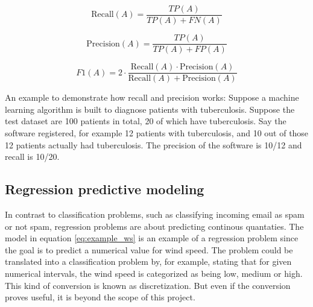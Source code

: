 \begin{equation} \label{eq:recall}
	\mbox{Recall}(A) = \frac{TP(A)}{TP(A) + FN(A)}
\end{equation}

\begin{equation} \label{eq:precision}
	\mbox{Precision}(A) = \frac{TP(A)}{TP(A) + FP(A)}
\end{equation}

\begin{equation} \label{eq:f1}
	F1(A) = 2 \cdot \frac{\mbox{Recall}(A) \cdot \mbox{Precision}(A)}{\mbox{Recall}(A) + \mbox{Precision}(A)}
\end{equation}

	An example to demonstrate how recall and precision works: Suppose a machine learning algorithm is built to diagnose patients with tuberculosis. Suppose the test dataset are 100 patients in total, 20 of which have tuberculosis. Say the software registered, for example 12 patients with tuberculosis, and 10 out of those 12 patients actually had tuberculosis. The precision of the software is 10/12 and recall is 10/20.


	\subsection{Regression predictive modeling} \label{sec:regression}
	In contrast to classification problems, such as classifying incoming email as spam or not spam, regression problems are about predicting continous quantaties. The model in equation \ref{eq:example_ws} is an example of a regression problem since the goal is to predict a numerical value for wind speed. The problem could be translated into a classification problem by, for example, stating that for given numerical intervals, the wind speed is categorized as being low, medium or high. This kind of conversion is known as discretization. But even if the conversion proves useful, it is beyond the scope of this project. 

